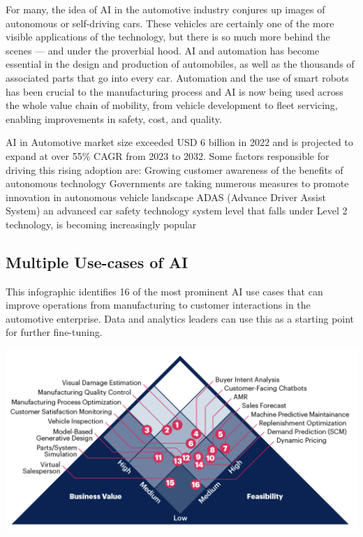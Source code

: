 \documentclass[
]{article}
\begin{document}
For many, the idea of AI in the automotive industry conjures up images of autonomous or self-driving cars. These vehicles are certainly one of the more visible applications of the technology, but there is so much more behind the scenes --- and under the proverbial hood. AI and automation has become essential in the design and production of automobiles, as well as the thousands of associated parts that go into every car. Automation and the use of smart robots has been crucial to the manufacturing process and AI is now being used across the whole value chain of mobility, from vehicle development to fleet servicing, enabling improvements in safety, cost, and quality.

AI in Automotive market size exceeded USD 6 billion in 2022 and is projected to expand at over 55\% CAGR from 2023 to 2032. Some factors responsible for driving this rising adoption are:
Growing customer awareness of the benefits of autonomous technology
Governments are taking numerous measures to promote innovation in autonomous vehicle landscape
ADAS (Advance Driver Assist System) an advanced car safety technology system level that falls under Level 2 technology, is becoming increasingly popular

\hypertarget{multiple-use-cases-of-ai}{%
\subsection{Multiple Use-cases of AI}\label{multiple-use-cases-of-ai}}

This infographic identifies 16 of the most prominent AI use cases that can improve operations from manufacturing to customer interactions in the automotive enterprise. Data and analytics leaders can use this as a starting point for further fine-tuning.

\includegraphics{Pyramid.png}
\end{document}
